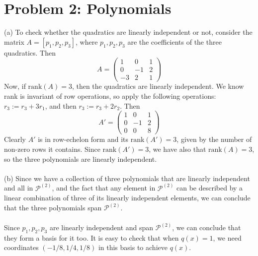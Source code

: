 \documentclass{article}
\begin{document}
\section*{Problem 2: Polynomials}
(a) To check whether the quadratics are linearly independent or not, consider the matrix $A = [p_{1}, p_{2}, p_{3}]$, where $p_{1}, p_{2}, p_{3}$ are the coefficients of the three quadratics. Then
\begin{equation*}
    A = \begin{pmatrix}
        1 & 0 & 1\\
        0 & -1 & 2\\
        -3 & 2 & 1
    \end{pmatrix}
\end{equation*}
Now, if $\text{rank}(A) = 3$, then the quadratics are linearly independent. We know rank is invariant of row operations, so apply the following operations: $r_{3} := r_{3} + 3r_{1}$, and then $r_{3} := r_{3} + 2r_{2}$. Then
\begin{equation*}
    A' = \begin{pmatrix}
        1 & 0 & 1\\
        0 & -1 & 2\\
        0 & 0& 8
    \end{pmatrix}
\end{equation*}
Clearly $A'$ is in row-echelon form and its $\text{rank}(A') = 3$, given by the number of non-zero rows it contains. Since $\text{rank}(A') = 3$, we have also that $\text{rank}(A) = 3$, so the three polynomials are linearly independent. \\\\
(b) Since we have a collection of three polynomials that are linearly independent and all in $\mathcal{P}^{(2)}$, and the fact that any element in $\mathcal{P}^{(2)}$ can be described by a linear combination of three of its linearly independent elements, we can conclude that the three polynomials span $\mathcal{P}^{(2)}$. \\\\
 Since $p_{1}, p_{2}, p_{3}$ are linearly independent and span $\mathcal{P}^{(2)}$, we can conclude that they form a basis for it too. It is easy to check that when $q(x) = 1$, we need coordinates $(-1/8, 1/4, 1/8)$ in this basis to achieve $q(x)$.  \newpage
\end{document}
